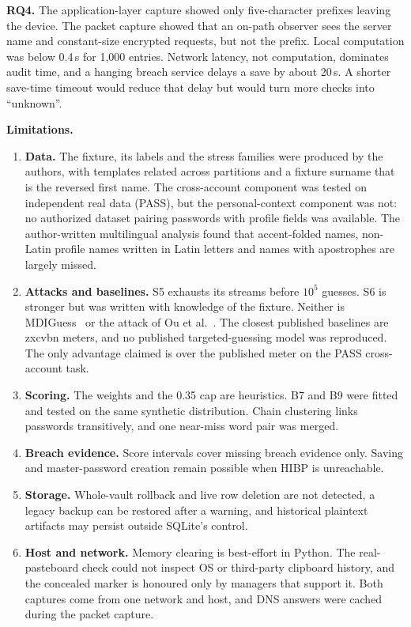 \documentclass[conference]{IEEEtran}
\begin{document}
\textbf{RQ4.} The application-layer capture showed only five-character prefixes leaving the device. The packet capture showed that an on-path observer sees the server name and constant-size encrypted requests, but not the prefix. Local computation was below 0.4\,s for 1,000 entries. Network latency, not computation, dominates audit time, and a hanging breach service delays a save by about 20\,s. A shorter save-time timeout would reduce that delay but would turn more checks into ``unknown''.

\textbf{Limitations.}
\begin{enumerate}
\item \textbf{Data.} The fixture, its labels and the stress families were produced by the authors, with templates related across partitions and a fixture surname that is the reversed first name. The cross-account component was tested on independent real data (PASS), but the personal-context component was not: no authorized dataset pairing passwords with profile fields was available. The author-written multilingual analysis found that accent-folded names, non-Latin profile names written in Latin letters and names with apostrophes are largely missed.
\item \textbf{Attacks and baselines.} S5 exhausts its streams before $10^5$ guesses. S6 is stronger but was written with knowledge of the fixture. Neither is MDIGuess~\cite{mdiguess} or the attack of Ou et al.~\cite{ou2026}. The closest published baselines are zxcvbn meters, and no published targeted-guessing model was reproduced. The only advantage claimed is over the published meter on the PASS cross-account task.
\item \textbf{Scoring.} The weights and the 0.35 cap are heuristics. B7 and B9 were fitted and tested on the same synthetic distribution. Chain clustering links passwords transitively, and one near-miss word pair was merged.
\item \textbf{Breach evidence.} Score intervals cover missing breach evidence only. Saving and master-password creation remain possible when HIBP is unreachable.
\item \textbf{Storage.} Whole-vault rollback and live row deletion are not detected, a legacy backup can be restored after a warning, and historical plaintext artifacts may persist outside SQLite's control.
\item \textbf{Host and network.} Memory clearing is best-effort in Python. The real-pasteboard check could not inspect OS or third-party clipboard history, and the concealed marker is honoured only by managers that support it. Both captures come from one network and host, and DNS answers were cached during the packet capture.

\end{enumerate}
\end{document}
